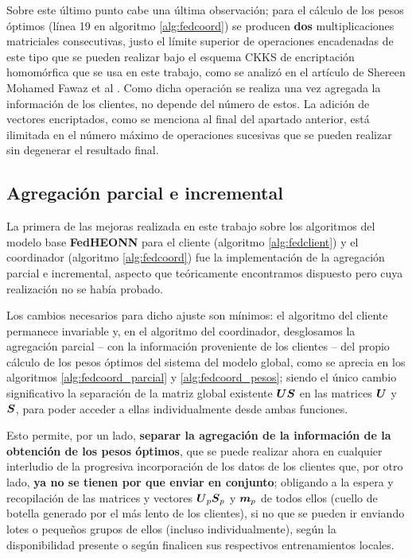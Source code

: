 \documentclass[00-Trabajo_Final.tex]{subfiles}
\begin{document}
\vspace{0.5em}

Sobre este último punto cabe una última observación; para el cálculo de los pesos óptimos (línea 19 en algoritmo \ref{alg:fedcoord}) se producen \textbf{dos} multiplicaciones matriciales consecutivas, justo el límite superior de operaciones encadenadas de este tipo que se pueden realizar bajo el esquema CKKS de encriptación homomórfica que se usa en este trabajo, como se analizó en el artículo de Shereen Mohamed Fawaz et al \cite{seal_study}. Como dicha operación se realiza una vez agregada la información de los clientes, no depende del número de estos. La adición de vectores encriptados, como se menciona al final del apartado anterior, está ilimitada en el número máximo de operaciones sucesivas que se pueden realizar sin degenerar el resultado final.

\subsection{Agregación parcial e incremental}
La primera de las mejoras realizada en este trabajo sobre los algoritmos del modelo base \textbf{FedHEONN} para el cliente (algoritmo \ref{alg:fedclient}) y el coordinador (algoritmo \ref{alg:fedcoord}) fue la implementación de la agregación parcial e incremental, aspecto que teóricamente encontramos dispuesto pero cuya realización no se había probado.

\vspace{0.5em}

Los cambios necesarios para dicho ajuste son mínimos: el algoritmo del cliente permanece invariable y, en el algoritmo del coordinador, desglosamos la agregación parcial{ }--{ }con la información proveniente de los clientes{ }--{ }del propio cálculo de los pesos óptimos del sistema del modelo global, como se aprecia en los algoritmos \ref{alg:fedcoord_parcial} y \ref{alg:fedcoord_pesos}; siendo el único cambio significativo la separación de la matriz global existente $\boldsymbol{US}$ en las matrices $\boldsymbol{U}$ y $\boldsymbol{S}$, para poder acceder a ellas individualmente desde ambas funciones.

\vspace{0.5em}

Esto permite, por un lado, \textbf{separar la agregación de la información de la obtención de los pesos óptimos}, que se puede realizar ahora en cualquier interludio de la progresiva incorporación de los datos de los clientes que, por otro lado, \textbf{ya no se tienen por que enviar en conjunto}; obligando a la espera y recopilación de las matrices y vectores $\boldsymbol{U}_p\boldsymbol{S}_p$ y $\boldsymbol{m}_p$ de todos ellos (cuello de botella generado por el más lento de los clientes), si no que se pueden ir enviando lotes o pequeños grupos de ellos (incluso individualmente), según la disponibilidad presente o según finalicen sus respectivos entrenamientos locales.
\end{document}
